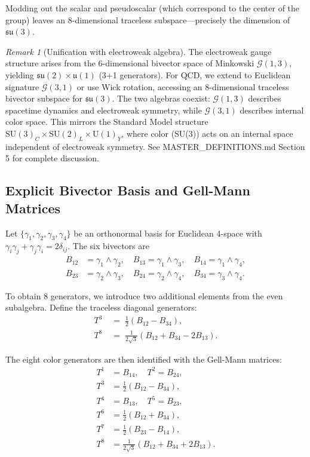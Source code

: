 \documentclass[11pt,a4paper]{article}
\newcommand{\Cl}{\mathcal{G}}
\newcommand{\SU}{\mathrm{SU}}
\newcommand{\U}{\mathrm{U}}
\theoremstyle{definition}
\theoremstyle{plain}
\theoremstyle{remark}
\newtheorem{remark}{Remark}[section]
\begin{document}
Modding out the scalar and pseudoscalar (which correspond to the center of the group) leaves an 8-dimensional traceless subspace---precisely the dimension of $\mathfrak{su}(3)$.

\begin{remark}[Unification with electroweak algebra]
The electroweak gauge structure arises from the 6-dimensional bivector space of Minkowski $\Cl(1,3)$, yielding $\mathfrak{su}(2) \times \mathfrak{u}(1)$ (3+1 generators). For QCD, we extend to Euclidean signature $\Cl(3,1)$ or use Wick rotation, accessing an 8-dimensional traceless bivector subspace for $\mathfrak{su}(3)$. The two algebras coexist: $\Cl(1,3)$ describes spacetime dynamics and electroweak symmetry, while $\Cl(3,1)$ describes internal color space. This mirrors the Standard Model structure $\SU(3)_C \times \SU(2)_L \times \U(1)_Y$, where color (SU(3)) acts on an internal space independent of electroweak symmetry. See MASTER\_DEFINITIONS.md Section 5 for complete discussion.
\end{remark}

\subsection{Explicit Bivector Basis and Gell-Mann Matrices}

Let $\{\gamma_1, \gamma_2, \gamma_3, \gamma_4\}$ be an orthonormal basis for Euclidean 4-space with $\gamma_i \gamma_j + \gamma_j \gamma_i = 2\delta_{ij}$. The six bivectors are
\begin{equation}
\begin{aligned}
B_{12} &= \gamma_1 \wedge \gamma_2, \quad B_{13} = \gamma_1 \wedge \gamma_3, \quad B_{14} = \gamma_1 \wedge \gamma_4, \\
B_{23} &= \gamma_2 \wedge \gamma_3, \quad B_{24} = \gamma_2 \wedge \gamma_4, \quad B_{34} = \gamma_3 \wedge \gamma_4.
\end{aligned}
\label{eq:bivector-basis-6d}
\end{equation}

To obtain 8 generators, we introduce two additional elements from the even subalgebra. Define the traceless diagonal generators:
\begin{align}
T^3 &\;=\; \frac{1}{2}(B_{12} - B_{34}), \\
T^8 &\;=\; \frac{1}{2\sqrt{3}}(B_{12} + B_{34} - 2B_{13}).
\end{align}

The eight color generators are then identified with the Gell-Mann matrices:
\begin{align}
T^1 &= B_{14}, \quad T^2 = B_{24}, \nonumber \\
T^3 &= \frac{1}{2}(B_{12} - B_{34}), \nonumber \\
T^4 &= B_{13}, \quad T^5 = B_{23}, \nonumber \\
T^6 &= \frac{1}{2}(B_{12} + B_{34}), \nonumber \\
T^7 &= \frac{1}{2}(B_{23} - B_{14}), \nonumber \\
T^8 &= \frac{1}{2\sqrt{3}}(B_{12} + B_{34} + 2B_{13}).
\label{eq:color-generators}
\end{align}
\end{document}
